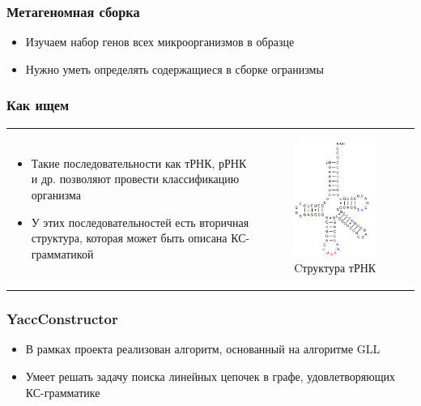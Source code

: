 \documentclass{beamer}
\begin{document}
\begin{frame}
	\frametitle{Метагеномная сборка}
	\begin{itemize}
		\item Изучаем набор генов всех микроорганизмов в образце
		\item Нужно уметь определять содержащиеся в сборке огранизмы
	\end{itemize}
\end{frame}

\begin{frame}
	\frametitle{Как ищем}
	\begin{tabular}{p{6cm} p{5cm}}
		\begin{itemize}
			\item Такие последовательности как тРНК, рРНК и др. позволяют провести классификацию организма
			\item У этих последовательностей есть вторичная структура, которая может быть описана КС-грамматикой
		\end{itemize}
		&
		\vspace{-1cm}
		\begin{figure}[b]
			\centering
			\includegraphics[width=5.2cm]{pictures/TRNA.png}
			\caption{Cтруктура тРНК}
		\end{figure}
	\end{tabular}  
\end{frame}

\begin{frame}
	\frametitle{YaccConstructor}
	\begin{itemize}
		\item В рамках проекта реализован алгоритм, основанный на алгоритме GLL
		\item Умеет решать задачу поиска линейных цепочек в графе, удовлетворяющих КС-грамматике
	\end{itemize}
\end{frame}
\end{document}
